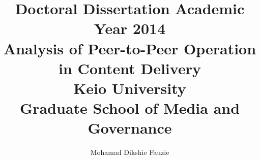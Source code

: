\title{Doctoral Dissertation Academic Year 2014\\
\vspace{5cm}
Analysis of Peer-to-Peer Operation in Content Delivery \\
\vspace{5cm}
Keio University \\
Graduate School of Media and Governance}
\author{Mohamad Dikshie Fauzie}
\date{}
\maketitle
